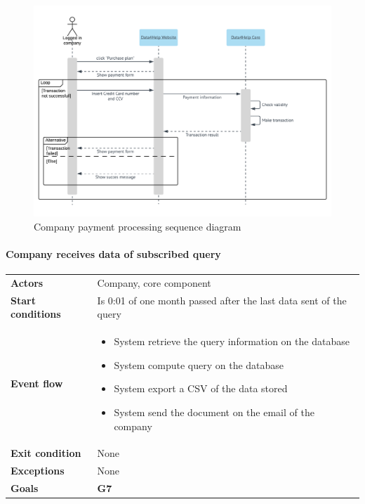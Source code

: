 \begin{figure}[H]
  \includegraphics[width=\textwidth,height=\textheight,keepaspectratio]{assets/sequence/CompanyPaymentProcessing.pdf}
  \caption{Company payment processing sequence diagram}
  \label{fig:CompanyPaymentProcessing}
\end{figure}











\newpage
\paragraph{Company receives data of subscribed query}
\begin{center}
\begin{table}[H]
\centering
\begin{tabular}{l|p{}}
\textbf{Actors} & 
Company, core component
 \\
\textbf{Start conditions} & Is 0:01 of one month passed after the last data sent of the query \\
\textbf{Event flow}  & \begin{minipage}[t]{0.7\textwidth}
    \begin{itemize}
       \item System retrieve the query information on the database

        \item System compute query on the database
        \item System export a CSV of the data stored
        \item System send the document on the email of the company 


    \end{itemize}
    
\end{minipage} \\
\textbf{Exit condition} & None \\
\textbf{Exceptions} & None \\
\textbf{Goals} & \textbf{G7} 
\end{tabular}

\end{table}
\end{center}


